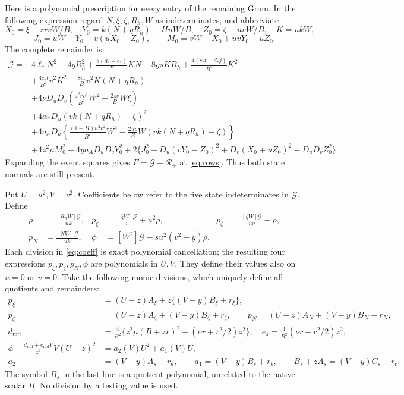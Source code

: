 \documentclass[10pt]{article}
\newcommand{\Du}{D_u}
\newcommand{\Dv}{D_v}
\newcommand{\coef}[1]{[#1]}
\begin{document}
Here is a polynomial prescription for every entry of the remaining Gram.
In the following expression regard \(N,\xi,\zeta,R_h,W\) as indeterminates,
and abbreviate
\[
 X_0=\xi-zrvW/B,\quad Y_0=k(N+qR_h)+HuW/B,\quad
 Z_0=\zeta+uvW/B,\quad K=ukW,
\]
\[
 J_0=uW-Y_0+v(uX_0-Z_0),\qquad
 M_0=vW-X_0+uvY_0-uZ_0.
\]
The complete remainder is
\begin{equation}
\begin{split}
 \mathcal G={}&4\ell_*N^2+4gR_h^2
 +\frac{8(d_*-c_*)}{B}KN-8gsKR_h
 +\frac{4(c_*t+d_*j)}{B^2}K^2\\
 &+\frac{4c_*t}{B^2}v^2K^2-\frac{8c_*}{B}v^2K(N+qR_h)\\
 &+4\nu\Du\Dv\left(\frac{z^2rv^2}{B^2}W^2-\frac{2zv}{B}W\xi\right)\\
 &+4\alpha_*\Du(vk(N+qR_h)-\zeta)^2\\
 &+4a_\alpha\Du\left\{\frac{(1-H)u^2v^2}{B^2}W^2
       -\frac{2uv}{B}W(vk(N+qR_h)-\zeta)\right\}\\
 &+4z^2\mu M_0^2+4ya_A\Du\Dv Y_0^2
 +2\{J_0^2+\Du(vY_0-Z_0)^2+\Dv(X_0+uZ_0)^2-\Du\Dv Z_0^2\}.
\end{split}\label{eq:G}
\end{equation}
Expanding the event squares gives \(F=\mathcal G+\mathcal R_+\) at
\eqref{eq:rows}. Thus both state normals are still present.

Put \(U=u^2,V=v^2\). Coefficients below refer to the five state
indeterminates in \(\mathcal G\). Define
\begin{align}
 \rho&=\frac{\coef{R_hW}\mathcal G}{uk},&
 p_\xi&=\frac{\coef{\xi W}\mathcal G}{v}+u^2\rho,&
 p_\zeta&=\frac{\coef{\zeta W}\mathcal G}{uv}-\rho,\nonumber\\
 p_N&=\frac{\coef{NW}\mathcal G}{uk},&
 \phi&=\coef{W^2}\mathcal G-su^2(v^2-y)\rho.          \label{eq:coeff}
\end{align}
Each division in \eqref{eq:coeff} is exact polynomial cancellation;
the resulting four expressions \(p_\xi,p_\zeta,p_N,\phi\) are
polynomials in \(U,V\). They define their values also on \(u=0\) or \(v=0\).
Take the following monic divisions, which uniquely define all quotients
and remainders:
\begin{align}
 p_\xi&=(U-z)A_\xi+z\{(V-y)B_\xi+r_\xi\},\nonumber\\
 p_\zeta&=(U-z)A_\zeta+(V-y)B_\zeta+r_\zeta,\qquad
 p_N=(U-z)A_N+(V-y)B_N+r_N,                         \label{eq:divnormal}\\
 d_{\mathrm{rad}}&=\frac4{B^2}\{z^2\mu(B+zr)^2+(\nu r+r^2/2)z^2\},\quad
 e_s=\frac4{B^2}(\nu r+r^2/2)z^2,\nonumber\\
 \phi-\frac{d_{\mathrm{rad}}+e_{\mathrm{rad}}V}{z^2}V(U-z)^2
       &=a_2(V)U^2+a_1(V)U,\nonumber\\
 a_2&=(V-y)A_s+r_a,\qquad a_1=(V-y)B_s+r_b,\qquad
 B_s+zA_s=(V-y)C_s+r_c.                            \label{eq:divscalar}
\end{align}
The symbol \(B_s\) in the last line is a quotient polynomial, unrelated
to the native scalar \(B\). No division by a testing value is used.
\end{document}
